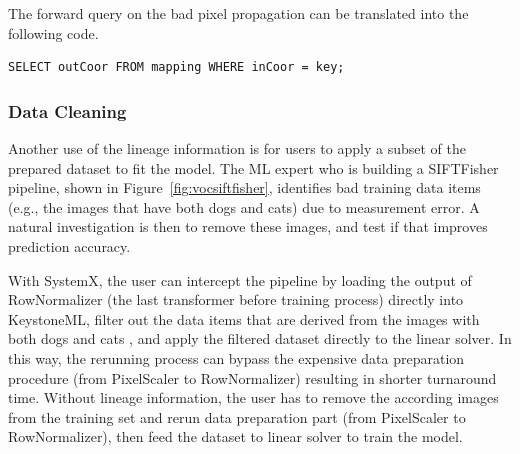 \documentclass{sig-alternate}
\begin{document}
The forward query on the bad pixel propagation can be translated into the following code.
\begin{lstlisting}
SELECT outCoor FROM mapping WHERE inCoor = key;
\end{lstlisting}

\subsubsection{Data Cleaning}
\label{sec:Back-Case-Cleaning}
Another use of the lineage information is for users to apply a subset of the prepared dataset to fit the model. 
The ML expert who is building a SIFTFisher pipeline, shown in Figure~\ref{fig:vocsiftfisher}, identifies bad 
training data items (e.g., the images that have both dogs and cats) due to measurement error. 
A natural investigation is then to remove these images, and test if that improves prediction accuracy.

With SystemX, the user can intercept the pipeline by loading the output of RowNormalizer (the last transformer before training process) 
directly into KeystoneML, filter out the data items that are derived from the images with both dogs and cats , 
and apply the filtered dataset directly to the linear solver.
In this way, the rerunning process can bypass the expensive data preparation procedure (from PixelScaler to RowNormalizer) 
resulting in shorter turnaround time.
Without lineage information, the user has to remove the according images from the training set and rerun data
preparation part (from PixelScaler to RowNormalizer), then feed the dataset to linear solver to train the model.



\end{document}
